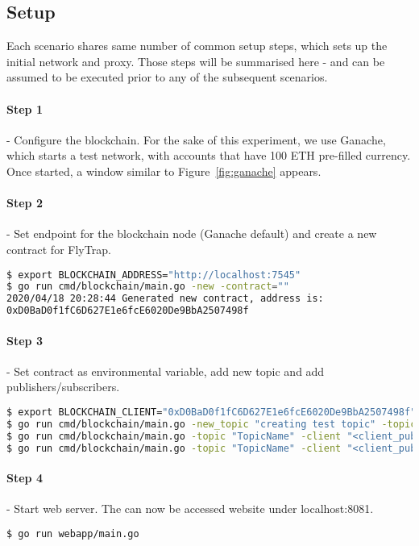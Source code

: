 \subsection{Setup}
Each scenario shares same number of common setup steps, which sets up the initial network and proxy. Those steps will be summarised here - and can be assumed to be executed prior to any of the subsequent scenarios.
\paragraph{Step 1} - Configure the blockchain. For the sake of this experiment, we use Ganache, which starts a test network, with accounts that have 100 ETH pre-filled currency. Once started, a window similar to Figure~\ref{fig:ganache} appears.
\paragraph{Step 2} - Set endpoint for the blockchain node (Ganache default) and create a new contract for FlyTrap.
\begin{lstlisting}[language=bash]
$ export BLOCKCHAIN_ADDRESS="http://localhost:7545"
$ go run cmd/blockchain/main.go -new -contract=""
2020/04/18 20:28:44 Generated new contract, address is:
0xD0BaD0f1fC6D627E1e6fcE6020De9BbA2507498f
\end{lstlisting}
\paragraph{Step 3} - Set contract as environmental variable, add new topic and add publishers/subscribers.
\begin{lstlisting}[language=bash,breaklines=true]
$ export BLOCKCHAIN_CLIENT="0xD0BaD0f1fC6D627E1e6fcE6020De9BbA2507498f"
$ go run cmd/blockchain/main.go -new_topic "creating test topic" -topic "TopicName"
$ go run cmd/blockchain/main.go -topic "TopicName" -client "<client_pubkey>" -pub "adding test publisher"
$ go run cmd/blockchain/main.go -topic "TopicName" -client "<client_pubkey>" -sub "adding test subscriber"
\end{lstlisting}
\paragraph{Step 4} - Start web server. The can now be accessed website under localhost:8081.
\begin{lstlisting}[language=bash,breaklines=true]
$ go run webapp/main.go
\end{lstlisting}
